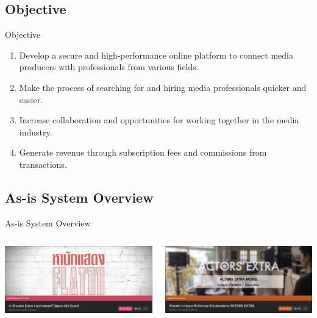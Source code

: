 \documentclass[aspectratio=169]{beamer}
\begin{document}
\subsection{Objective}
\begin{frame}{Objective}
    \begin{enumerate}
        \item Develop a secure and high-performance online platform to connect media producers with professionals from various fields.
        \item Make the process of searching for and hiring media professionals quicker and easier.
        \item Increase collaboration and opportunities for working together in the media industry.
        \item Generate revenue through subscription fees and commissions from transactions.
    \end{enumerate}
\end{frame}

\subsection{As-is System Overview}
\begin{frame}{As-is System Overview}
    \begin{columns}

        \begin{column}{0.5\textwidth}
            \centering
            \includegraphics[width=\textwidth]{FBGroup1.png}
        \end{column}

        \begin{column}{0.5\textwidth}
            \centering
            \includegraphics[width=\textwidth]{FBGroup2.png}
        \end{column}

    \end{columns}
\end{frame}
\end{document}
